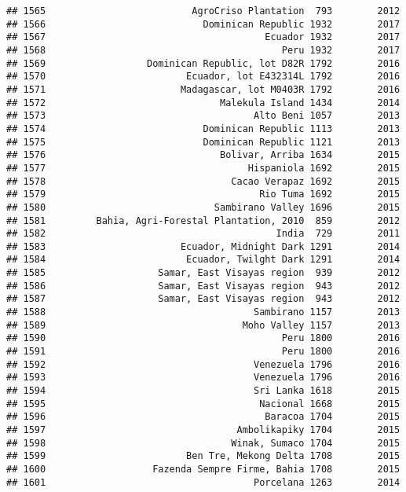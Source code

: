 \documentclass[
]{article}
\begin{document}
\begin{verbatim}
## 1565                          AgroCriso Plantation  793        2012
## 1566                            Dominican Republic 1932        2017
## 1567                                       Ecuador 1932        2017
## 1568                                          Peru 1932        2017
## 1569                  Dominican Republic, lot D82R 1792        2016
## 1570                         Ecuador, lot E432314L 1792        2016
## 1571                        Madagascar, lot M0403R 1792        2016
## 1572                               Malekula Island 1434        2014
## 1573                                     Alto Beni 1057        2013
## 1574                            Dominican Republic 1113        2013
## 1575                            Dominican Republic 1121        2013
## 1576                               Bolivar, Arriba 1634        2015
## 1577                                    Hispaniola 1692        2015
## 1578                                 Cacao Verapaz 1692        2015
## 1579                                      Rio Tuma 1692        2015
## 1580                              Sambirano Valley 1696        2015
## 1581         Bahia, Agri-Forestal Plantation, 2010  859        2012
## 1582                                         India  729        2011
## 1583                        Ecuador, Midnight Dark 1291        2014
## 1584                         Ecuador, Twilght Dark 1291        2014
## 1585                    Samar, East Visayas region  939        2012
## 1586                    Samar, East Visayas region  943        2012
## 1587                    Samar, East Visayas region  943        2012
## 1588                                     Sambirano 1157        2013
## 1589                                   Moho Valley 1157        2013
## 1590                                          Peru 1800        2016
## 1591                                          Peru 1800        2016
## 1592                                     Venezuela 1796        2016
## 1593                                     Venezuela 1796        2016
## 1594                                     Sri Lanka 1618        2015
## 1595                                      Nacional 1668        2015
## 1596                                       Baracoa 1704        2015
## 1597                                  Ambolikapiky 1704        2015
## 1598                                 Winak, Sumaco 1704        2015
## 1599                         Ben Tre, Mekong Delta 1708        2015
## 1600                   Fazenda Sempre Firme, Bahia 1708        2015
## 1601                                     Porcelana 1263        2014

\end{verbatim}
\end{document}
